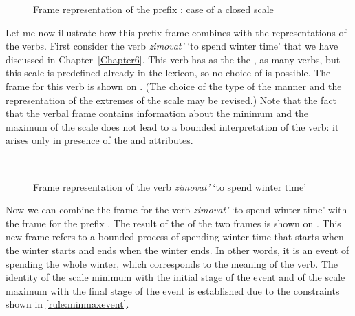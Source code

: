 \begin{figure}
\centering
{}
\caption{Frame representation of the prefix : case of a closed scale \label{frame:pere:distr}}
\end{figure}

Let me now illustrate how this prefix frame combines with the representations of the verbs. First consider the verb \textit{zimovat'} `to spend winter time' that we have discussed in Chapter~\ref{Chapter6}. This verb has as the  the , as many verbs, but this scale is predefined already in the lexicon, so no choice of  is possible. The frame for this verb is shown on . (The choice of the type of the manner and the representation of the extremes of the scale may be revised.) Note that the fact that the verbal frame contains information about the minimum and the maximum of the scale does not lead to a bounded interpretation of the verb: it arises only in presence of the \INIT and \FIN attributes.

\begin{figure}
\centering
{}\\
\hfill
\caption{Frame representation of the verb \textit{zimovat'} `to spend winter time' \label{frame:zimovat}}
\end{figure}

Now we can combine the frame for the verb \textit{zimovat'} `to spend winter time' with the frame for the prefix . The result of the  of the two frames is shown on . This new frame refers to a bounded process of spending winter time that starts when the winter starts and ends when the winter ends. In other words, it is an event of spending the whole winter, which corresponds to the meaning of the verb. The identity of the scale minimum with the initial stage of the event and of the scale maximum with the final stage of the event is established due to the constraints shown in \ref{rule:minmaxevent}.

